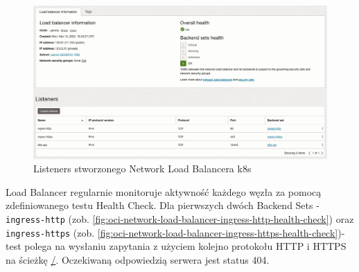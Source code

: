 \begin{figure}[H]
    \centering
    \includegraphics[width=\textwidth]{img/oci-network-load-balancer-k8s-listeners}
    \caption{Listeners stworzonego Network Load Balancera k8s}
    \label{fig:oci-network-load-balancer-k8s-listeners}
\end{figure}

Load Balancer regularnie monitoruje aktywność każdego węzła za pomocą zdefiniowanego testu Health Check.
Dla pierwszych dwóch Backend Sets - \texttt{ingress-http} (zob. \autoref{fig:oci-network-load-balancer-ingress-http-health-check}) oraz \texttt{ingress-https} (zob. \autoref{fig:oci-network-load-balancer-ingress-https-health-check})- test polega na wysłaniu zapytania z użyciem kolejno protokołu HTTP i HTTPS na ścieżkę \url{/}.
Oczekiwaną odpowiedzią serwera jest status 404.

